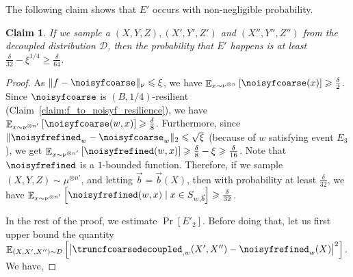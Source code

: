 \documentclass[11pt]{article}
\newtheorem{claim}[thm]{Claim}
\newcommand\card[1]{\left| {#1} \right|}
\newcommand\Expect[2]{{\mathop{\mathbb{E}}_{#1}\left[ {#2} \right]}}
\renewcommand\geq{\geqslant}
\renewcommand\leq{\leqslant}
\newcommand{\V}[1]{{#1}}
\begin{document}
The following claim shows that $E'$ occurs with non-negligible probability.
\begin{claim}
    If we sample a $(X, Y, Z), (X', Y', Z')$ and $(X'', Y'', Z'')$ from the decoupled distribution $\mathcal{D}$, then the probability that $E'$ happens is at least 
    $\frac{\delta}{32} - \xi^{1/4}\geq \frac{\delta}{64}$.
\end{claim}
\begin{proof}

As $\|f-\noisyfcoarse\|_\nu\leq \xi$, we have $\Expect{\V x\sim \nu^{\otimes n}}{\noisyfcoarse(\V x)} \geq \frac{\delta}{2}$. Since $\noisyfcoarse$ is $(B, 1/4)$-resilient (Claim~\ref{claim:f_to_noisyf_resilience}), we have $\Expect{\V x\sim \nu^{\otimes n'}}{\noisyfcoarse(\V w, \V x)}\geq \frac{\delta}{8}$. Furthermore, since $\|\noisyfrefined_{\V w} - \noisyfcoarse_{\V w}\|_2\leq \sqrt{\xi}$ (because of ${\V w}$ satisfying event $E_3$), we get $\Expect{\V x\sim \nu^{\otimes n'}}{\noisyfrefined(\V w, \V x)}\geq \frac{\delta}{8}-\xi \geq \frac{\delta}{16}$. Note that $\noisyfrefined$ is a $1$-bounded function. Therefore, if we sample $(X, Y, Z)\sim \mu^{\otimes n'}$, and letting $\vec{b} = \vec{b}(\V X)$, then with probability at least $\frac{\delta}{32}$, we have $\Expect{\V x\sim \nu^{\otimes n'}}{\noisyfrefined(\V w, \V x) \mid \V x\in S_{\V w, \vec{b}}}\geq \frac{\delta}{32}$. 

In the rest of the proof, we estimate $\Pr[E'_2]$. Before doing that, let us first upper bound the quantity $\Expect{(X,X',X'')\sim \mathcal{D}}{\card{\truncfcoarsedecoupled_{,\V w}(X',X'') - \noisyfrefined_{\V w}(X)}^2}$. We have,


\end{proof}
\end{document}
